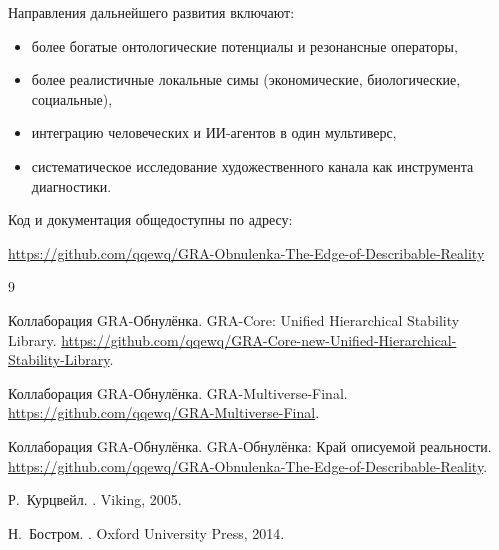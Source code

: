 \documentclass[11pt,a4paper]{article}
\begin{document}
Направления дальнейшего развития включают:
\begin{itemize}
  \item более богатые онтологические потенциалы
        и резонансные операторы,
  \item более реалистичные локальные симы
        (экономические, биологические, социальные),
  \item интеграцию человеческих и ИИ-агентов
        в один мультиверс,
  \item систематическое исследование художественного канала
        как инструмента диагностики.
\end{itemize}

Код и документация общедоступны по адресу:
\begin{center}
\url{https://github.com/qqewq/GRA-Obnulenka-The-Edge-of-Describable-Reality}
\end{center}

\begin{thebibliography}{9}

Коллаборация GRA-Обнулёнка.
\newblock GRA-Core: Unified Hierarchical Stability Library.
\newblock \url{https://github.com/qqewq/GRA-Core-new-Unified-Hierarchical-Stability-Library}.

Коллаборация GRA-Обнулёнка.
\newblock GRA-Multiverse-Final.
\newblock \url{https://github.com/qqewq/GRA-Multiverse-Final}.

Коллаборация GRA-Обнулёнка.
\newblock GRA-Обнулёнка: Край описуемой реальности.
\newblock \url{https://github.com/qqewq/GRA-Obnulenka-The-Edge-of-Describable-Reality}.

Р.~Курцвейл.
.
\newblock Viking, 2005.

Н.~Бостром.
.
\newblock Oxford University Press, 2014.

\end{thebibliography}
\end{document}

